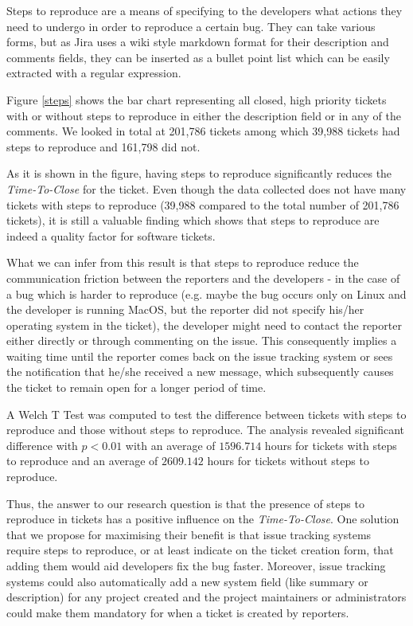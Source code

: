 \documentclass{mpaper}
\begin{document}
Steps to reproduce are a means of specifying to the developers what actions they need to undergo in order 
to reproduce a certain bug. They can take various forms, but as Jira uses a wiki style markdown format for 
their description and comments fields, they can be inserted as a bullet point list which can be easily 
extracted with a regular expression.

Figure \ref{steps} shows the bar chart representing all closed, high priority tickets with or without steps 
to reproduce in either the description field or in any of the comments. We looked in total at 201,786 tickets 
among which 39,988 tickets had steps to reproduce and 161,798 did not.

As it is shown in the figure, having steps to reproduce significantly reduces the \emph{Time-To-Close} 
for the ticket. Even though the data collected does not have many tickets with steps to reproduce 
(39,988 compared to the total number of 201,786 tickets), it is still a valuable finding which shows 
that steps to reproduce are indeed a quality factor for software tickets. 

What we can infer from this result is that steps to reproduce reduce the communication friction between 
the reporters and the developers - in the case of a bug which is harder to reproduce (e.g. maybe the 
bug occurs only on Linux and the developer is running MacOS, but the reporter did not specify his/her 
operating system in the ticket), the developer might need to contact the reporter either directly or 
through commenting on the issue. This consequently implies a waiting time until the reporter comes back on the 
issue tracking system or sees the notification that he/she received a new message, which subsequently causes 
the ticket to remain open for a longer period of time. 

A Welch T Test was computed to test the difference between tickets with steps to reproduce 
and those without steps to reproduce. The analysis revealed significant difference with 
$p < 0.01$ with an average of $1596.714$ hours for tickets with steps to reproduce and an average of 
$2609.142$ hours for tickets without steps to reproduce.

Thus, the answer to our research question is that the presence of steps to reproduce in tickets 
has a positive influence on the \emph{Time-To-Close}. One solution that we propose for maximising their benefit 
is that issue tracking systems require steps to reproduce, or at least indicate on the ticket creation form, 
that adding them would aid developers fix the bug faster. Moreover, 
issue tracking systems could also automatically add a new system field (like summary or description) 
for any project created and the project maintainers or administrators could make them mandatory for 
when a ticket is created by reporters.
\end{document}
